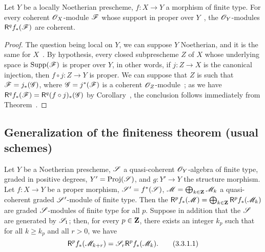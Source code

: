 \begin{cor}[3.2.4]
\label{3.3.2.4}
Let $Y$ be a locally Noetherian prescheme, $f:X\to Y$ a morphism of finite type.
For every coherent $\mathscr{O}_X$-module $\mathscr{F}$ whose support in proper over $Y$~, the $\mathscr{O}_Y$-modules $\mathsf{R}^q f_*(\mathscr{F})$ are coherent.
\end{cor}

\begin{proof}
\label{proof-3.3.2.4}
The question being local on $Y$, we can suppose $Y$ Noetherian, and it is the same for $X$~.
By hypothesis, every closed subprescheme $Z$ of $X$ whose underlying space is ${\mathop{\mathrm{Supp}}\nolimits}(\mathscr{F})$ is proper over $Y$, in other words, if $j:Z\to X$ is the canonical injection, then $f\circ j:Z\to Y$ is proper.
We can suppose that $Z$ is such that $\mathscr{F}=j_*(\mathscr{G})$, where $\mathscr{G}=j^*(\mathscr{F})$ is a coherent $\mathscr{O}_Z$-module~; as we have $\mathsf{R}^q f_*(\mathscr{F})=\mathsf{R}^q(f\circ j)_*(\mathscr{G})$ by Corollary~, the conclusion follows immediately from Theorem~.
\end{proof}

\subsection{Generalization of the finiteness theorem (usual schemes)}
\label{subsection:finiteness-theorem-generalization-usual}

\begin{prop}[3.3.1]
\label{3.3.3.1}
Let $Y$ be a Noetherian prescheme, $\mathscr{S}$ a quasi-coherent $\mathscr{O}_Y$-algebra of finite type, graded in positive degrees, $Y'={\mathop{\mathrm{Proj}}\nolimits}(\mathscr{S})$, and $g:Y'\to Y$ the structure morphism.
Let $f:X\to Y$ be a proper morphism, $\mathscr{S}'=f^*(\mathscr{S})$, $\mathscr{M}=\bigoplus_{k\in\mathbf{Z}}\mathscr{M}_k$ a quasi-coherent graded $\mathscr{S}'$-module of finite type.
Then the $\mathsf{R}^p f_*(\mathscr{M})=\bigoplus_{k\in\mathbf{Z}}\mathsf{R}^p f_*(\mathscr{M}_k)$ are graded $\mathscr{S}$-modules of finite type for all $p$.
Suppose in addition that the $\mathscr{S}$ are generated by $\mathscr{S}_1$; then, for every $p\in\mathbf{Z}$, there exists an integer $k_p$ such that for all $k\geq k_p$ and all $r>0$, we have
\[
\label{3.3.3.1.1}
  \mathsf{R}^p f_*(\mathscr{M}_{k+r})=\mathscr{S}_r\mathsf{R}^p f_*(\mathscr{M}_k).
  \tag{3.3.1.1}
\] 
\end{prop}

